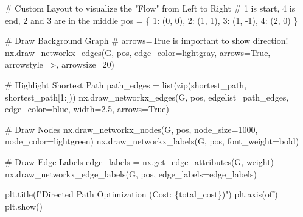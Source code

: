 \documentclass[
  letterpaper,
  DIV=11,
  numbers=noendperiod]{scrreprt}
\newenvironment{Shaded}{\begin{snugshade}}{\end{snugshade}}
\newcommand{\BuiltInTok}[1]{\textcolor[rgb]{0.00,0.23,0.31}{#1}}
\newcommand{\CommentTok}[1]{\textcolor[rgb]{0.37,0.37,0.37}{#1}}
\newcommand{\DecValTok}[1]{\textcolor[rgb]{0.68,0.00,0.00}{#1}}
\newcommand{\FloatTok}[1]{\textcolor[rgb]{0.68,0.00,0.00}{#1}}
\newcommand{\NormalTok}[1]{\textcolor[rgb]{0.00,0.23,0.31}{#1}}
\newcommand{\OperatorTok}[1]{\textcolor[rgb]{0.37,0.37,0.37}{#1}}
\newcommand{\SpecialCharTok}[1]{\textcolor[rgb]{0.37,0.37,0.37}{#1}}
\newcommand{\SpecialStringTok}[1]{\textcolor[rgb]{0.13,0.47,0.30}{#1}}
\newcommand{\StringTok}[1]{\textcolor[rgb]{0.13,0.47,0.30}{#1}}
\newcommand{\VariableTok}[1]{\textcolor[rgb]{0.07,0.07,0.07}{#1}}
\begin{document}
\begin{Shaded}
\begin{Highlighting}[]
\CommentTok{\# Custom Layout to visualize the "Flow" from Left to Right}
\CommentTok{\# 1 is start, 4 is end, 2 and 3 are in the middle}
\NormalTok{pos }\OperatorTok{=}\NormalTok{ \{}
    \DecValTok{1}\NormalTok{: (}\DecValTok{0}\NormalTok{, }\DecValTok{0}\NormalTok{),}
    \DecValTok{2}\NormalTok{: (}\DecValTok{1}\NormalTok{, }\DecValTok{1}\NormalTok{),}
    \DecValTok{3}\NormalTok{: (}\DecValTok{1}\NormalTok{, }\OperatorTok{{-}}\DecValTok{1}\NormalTok{),}
    \DecValTok{4}\NormalTok{: (}\DecValTok{2}\NormalTok{, }\DecValTok{0}\NormalTok{)}
\NormalTok{\}}

\CommentTok{\# Draw Background Graph}
\CommentTok{\# arrows=True is important to show direction!}
\NormalTok{nx.draw\_networkx\_edges(G, pos, edge\_color}\OperatorTok{=}\StringTok{\textquotesingle{}lightgray\textquotesingle{}}\NormalTok{, arrows}\OperatorTok{=}\VariableTok{True}\NormalTok{, arrowstyle}\OperatorTok{=}\StringTok{\textquotesingle{}{-}\textgreater{}\textquotesingle{}}\NormalTok{, arrowsize}\OperatorTok{=}\DecValTok{20}\NormalTok{)}

\CommentTok{\# Highlight Shortest Path}
\NormalTok{path\_edges }\OperatorTok{=} \BuiltInTok{list}\NormalTok{(}\BuiltInTok{zip}\NormalTok{(shortest\_path, shortest\_path[}\DecValTok{1}\NormalTok{:]))}
\NormalTok{nx.draw\_networkx\_edges(G, pos, edgelist}\OperatorTok{=}\NormalTok{path\_edges, edge\_color}\OperatorTok{=}\StringTok{\textquotesingle{}blue\textquotesingle{}}\NormalTok{, width}\OperatorTok{=}\FloatTok{2.5}\NormalTok{, arrows}\OperatorTok{=}\VariableTok{True}\NormalTok{)}

\CommentTok{\# Draw Nodes}
\NormalTok{nx.draw\_networkx\_nodes(G, pos, node\_size}\OperatorTok{=}\DecValTok{1000}\NormalTok{, node\_color}\OperatorTok{=}\StringTok{\textquotesingle{}lightgreen\textquotesingle{}}\NormalTok{)}
\NormalTok{nx.draw\_networkx\_labels(G, pos, font\_weight}\OperatorTok{=}\StringTok{\textquotesingle{}bold\textquotesingle{}}\NormalTok{)}

\CommentTok{\# Draw Edge Labels}
\NormalTok{edge\_labels }\OperatorTok{=}\NormalTok{ nx.get\_edge\_attributes(G, }\StringTok{\textquotesingle{}weight\textquotesingle{}}\NormalTok{)}
\NormalTok{nx.draw\_networkx\_edge\_labels(G, pos, edge\_labels}\OperatorTok{=}\NormalTok{edge\_labels)}

\NormalTok{plt.title(}\SpecialStringTok{f"Directed Path Optimization (Cost: }\SpecialCharTok{\{}\NormalTok{total\_cost}\SpecialCharTok{\}}\SpecialStringTok{)"}\NormalTok{)}
\NormalTok{plt.axis(}\StringTok{\textquotesingle{}off\textquotesingle{}}\NormalTok{)}
\NormalTok{plt.show()}
\end{Highlighting}
\end{Shaded}
\end{document}
